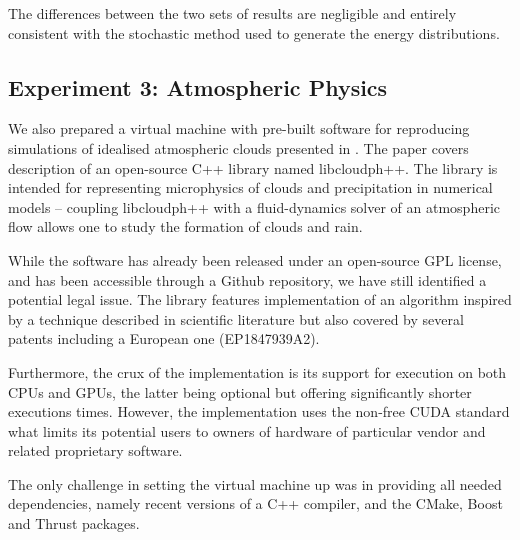 The differences between the two sets of results are negligible and entirely consistent with the stochastic method used to generate the energy distributions.


 
\subsection*{Experiment 3: Atmospheric Physics}

We also prepared a virtual machine with pre-built software for reproducing 
  simulations of idealised atmospheric clouds presented in \cite{arabas2013libcloud}.
The paper covers description of an open-source C++ library named libcloudph++. 
The library is intended for representing microphysics of clouds and precipitation
  in numerical models -- coupling libcloudph++ with a fluid-dynamics solver 
  of an atmospheric flow allows one to study the formation of clouds and rain.

While the software has already been released under an open-source GPL license,
  and has been accessible through a Github repository, we have still 
  identified a potential legal issue.
The library features implementation of an algorithm inspired by a technique 
  described in scientific literature but also covered by several patents 
  including a European one (EP1847939A2). 

Furthermore, the crux of the implementation is its support for execution
  on both CPUs and GPUs, the latter being optional but offering 
  significantly shorter executions times.
However, the implementation uses the non-free CUDA standard what limits its potential
  users to owners of hardware of particular vendor and related proprietary software.

The only challenge in setting the virtual machine up was in providing all needed
  dependencies, namely recent versions of a C++ compiler, and the CMake, Boost and Thrust 
  packages.
